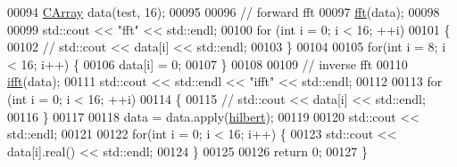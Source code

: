 \begin{DoxyCode}
00094     \hyperlink{fft__test_8cpp_ac43c8a7b2d97f3ccbd6f7a48beaa472c}{CArray} data(test, 16);
00095 
00096     \textcolor{comment}{// forward fft}
00097     \hyperlink{fft__test_8cpp_a22051cd252d576aec530227d32d95bdd}{fft}(data);
00098 
00099     std::cout << \textcolor{stringliteral}{"fft"} << std::endl;
00100     \textcolor{keywordflow}{for} (\textcolor{keywordtype}{int} i = 0; i < 16; ++i)
00101     \{
00102     \textcolor{comment}{//  std::cout << data[i] << std::endl;}
00103     \}
00104 
00105     \textcolor{keywordflow}{for}(\textcolor{keywordtype}{int} i = 8; i < 16; i++) \{
00106         data[i] = 0;
00107     \}
00108 
00109     \textcolor{comment}{// inverse fft}
00110     \hyperlink{fft__test_8cpp_a6234aee8acb83780e803805365617f36}{ifft}(data);
00111     std::cout << std::endl << \textcolor{stringliteral}{"ifft"} << std::endl;
00112 
00113     \textcolor{keywordflow}{for} (\textcolor{keywordtype}{int} i = 0; i < 16; ++i)
00114     \{
00115     \textcolor{comment}{//  std::cout << data[i] << std::endl;}
00116     \}
00117 
00118     data = data.apply(\hyperlink{fft__test_8cpp_adc49b5a69e64611f421bbefee39a4d15}{hilbert});
00119 
00120     std::cout << std::endl;
00121 
00122     \textcolor{keywordflow}{for}(\textcolor{keywordtype}{int} i = 0; i < 16; i++) \{
00123         std::cout << data[i].real() << std::endl;
00124     \}
00125 
00126     \textcolor{keywordflow}{return} 0;
00127 \}
\end{DoxyCode}
